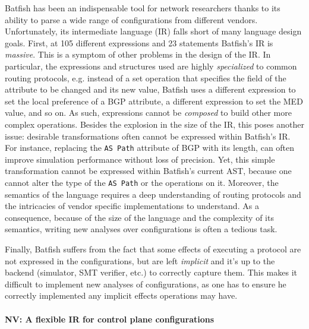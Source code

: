 \documentclass[sigconf,10pt]{acmart}
\begin{document}
Batfish has been an indispensable tool for network researchers thanks
to its ability to parse a wide range of configurations from different
vendors. Unfortunately, its intermediate language (IR) falls short of
many language design goals. First, at 105 different expressions and 23
statements Batfish's IR is \emph{massive}. This is a symptom of other
problems in the design of the IR. In particular, the expressions and
structures used are highly \emph{specialized} to common routing
protocols, e.g. instead of a set operation that specifies the field of
the attribute to be changed and its new value, Batfish uses a
different expression to set the local preference of a BGP attribute, a
different expression to set the MED value, and so on. As such,
expressions cannot be \emph{composed} to build other more complex
operations. Besides the explosion in the size of the IR, this poses
another issue: desirable transformations often cannot be expressed
within Batfish's IR. For instance, replacing the \texttt{AS Path}
attribute of BGP with its length, can often improve simulation
performance without loss of precision. Yet, this simple transformation
cannot be expressed within Batfish's current AST, because one cannot
alter the type of the \texttt{AS Path} or the operations on
it. Moreover, the semantics of the language requires a deep
understanding of routing protocols and the intricacies of vendor
specific implementations to understand. As a consequence, because of
the size of the language and the complexity of its semantics, writing
new analyses over configurations is often a tedious task.

Finally, Batfish suffers from the fact that some effects of executing
a protocol are not expressed in the configurations, but are left
\emph{implicit} and it's up to the backend (simulator, SMT verifier,
etc.) to correctly capture them. This makes it difficult to implement
new analyses of configurations, as one has to ensure he correctly
implemented any implicit effects operations may have.

\paragraph{NV: A flexible IR for control plane configurations}
\end{document}

